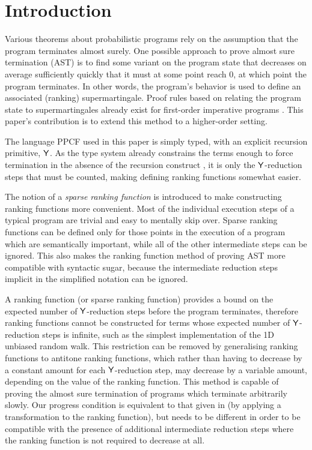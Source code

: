 
\section{Introduction}
\label{sec:intro}


Various theorems about probabilistic programs rely on the assumption that the program terminates almost surely. One possible approach to prove almost sure termination (AST) is to find some variant on the program state that decreases on average sufficiently quickly that it must at some point reach 0, at which point the program terminates. In other words, the program's behavior is used to define an associated (ranking) supermartingale. Proof rules based on relating the program state to supermartingales already exist for first-order imperative programs \cite{DBLP:conf/cav/ChakarovS13,DBLP:conf/popl/FioritiH15,DBLP:journals/pacmpl/McIverMKK18}. This paper's contribution is to extend this method to a higher-order setting.

The language PPCF used in this paper is simply typed, with an explicit recursion primitive, $\mathsf{Y}$. As the type system already constrains the terms enough to force termination in the absence of the recursion construct \cite{tait1967,BarendregtDS2010}, it is only the $\mathsf{Y}$-reduction steps that must be counted, making defining ranking functions somewhat easier.

The notion of a \emph{sparse ranking function} is introduced to make constructing ranking functions more convenient. Most of the individual execution steps of a typical program are trivial and easy to mentally skip over. Sparse ranking functions can be defined only for those points in the execution of a program which are semantically important, while all of the other intermediate steps can be ignored. This also makes the ranking function method of proving AST more compatible with syntactic sugar, because the intermediate reduction steps implicit in the simplified notation can be ignored.

A ranking function (or sparse ranking function) provides a bound on the expected number of $\mathsf{Y}$-reduction steps before the program terminates, therefore ranking functions cannot be constructed for terms whose expected number of $\mathsf{Y}$-reduction steps is infinite, such as the simplest implementation of the 1D unbiased random walk. This restriction can be removed by generalising ranking functions to antitone ranking functions, which rather than having to decrease by a constant amount for each $\mathsf{Y}$-reduction step, may decrease by a variable amount, depending on the value of the ranking function. This method is capable of proving the almost sure termination of programs which terminate arbitrarily slowly. Our progress condition is equivalent to that given in \cite{DBLP:journals/pacmpl/McIverMKK18} (by applying a transformation to the ranking function), but needs to be different in order to be compatible with the presence of additional intermediate reduction steps where the ranking function is not required to decrease at all.

